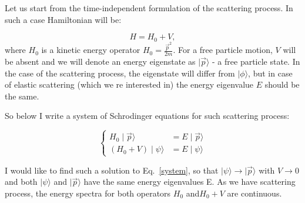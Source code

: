 



    Let us start from the time-independent formulation of the scattering process.
    In such a case Hamiltonian will be:

    \begin{equation}
        H = H_0 + V,
    \end{equation}
    where $H_0$ is a kinetic energy operator $H_0 = \frac{\vec{p}^2}{2m}$.
    For a free particle motion, $V$ will be absent and we will denote an energy eigenstate as
    $\mid \vec{p} \rangle$ - a free particle state.
    In the case of the scattering process, the eigenstate will differ from $\mid \phi \rangle$,
    but in case of elastic scattering (which we re interested in) the energy eigenvalue $E$ should be the same.

    So below I write a system of Schrodinger equations for such scattering process:

    \begin{equation}
        \begin{cases}
            H_0 \mid \vec{p} \rangle &= E \mid \vec{p} \rangle \\
            (H_0 + V) \mid \psi \rangle &= E \mid \psi \rangle
        \end{cases}
        \label{system}
    \end{equation}

    I would like to find such a solution to Eq.~\ref*{system}, so that 
    $\mid \psi \rangle \rightarrow \mid \vec{p} \rangle$ with $V \rightarrow 0$
    and both $\mid \psi \rangle$ and $\mid \vec{p} \rangle$ have the same energy eigenvalues E.
    As we have scattering process, the energy spectra for both operators $H_0$ and$H_0 + V$
    are continuous. 

